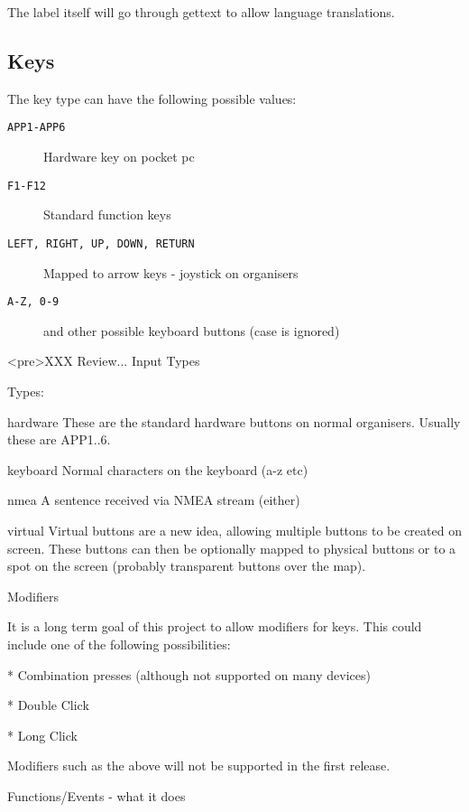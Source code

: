 The label itself will go through gettext to allow language
translations.

\subsection{Keys}

The key type can have the following possible values:

\begin{description}
\item[\texttt{APP1-APP6}] Hardware key on pocket pc
\item[\texttt{F1-F12}] Standard function keys
\item[\texttt{LEFT, RIGHT, UP, DOWN, RETURN}] Mapped to arrow keys - joystick on
  organisers
\item[\texttt{A-Z, 0-9}] and other possible keyboard buttons (case is ignored)
\end{description}


<pre>XXX Review...
				Input Types

				Types:

				hardware	These are the standard hardware buttons 
				on normal organisers. Usually these are
				APP1..6.

				keyboard	Normal characters on the keyboard (a-z etc)

				nmea		A sentence received via NMEA stream (either)

				virtual		Virtual buttons are a new idea, allowing
				multiple buttons to be created on screen.
				These buttons can then be optionally mapped
				to physical buttons or to a spot on the 
				screen (probably transparent buttons over 
				the map).

				Modifiers

				It is a long term goal of this project to allow modifiers for keys.
				This could include one of the following possibilities:

				* Combination presses (although not supported on many devices)

				* Double Click

				* Long Click

				Modifiers such as the above will not be supported in the first release.

				Functions/Events - what it does

